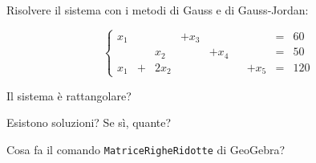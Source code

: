 \documentclass{beamer}
\begin{document}
\generatitolo

\begin{frame}{\esercizi}

Risolvere il sistema con i metodi di Gauss e di Gauss-Jordan:

\[
\left\lbrace
\begin{array}{rrrrrrrcr}
 x_1 & &       &+x_3& & & & = &  60 \\
     & &   x_2 &&+x_4 & & & = &  50  \\
 x_1 &+& 2 x_2 && & &+x_5& = & 120
\end{array}
\right.
\]

Il sistema \`e rattangolare?


Esistono soluzioni? Se s\`i, quante?

Cosa fa il comando \alert{\tt MatriceRigheRidotte} di GeoGebra?

\end{frame}
\end{document}
